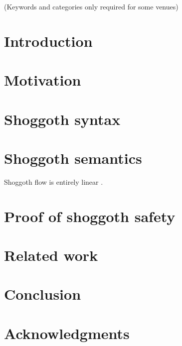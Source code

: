 \maketitle

\begin{abstract}
  
\end{abstract}

\iffinalformat

    \keywords

    (Keywords and categories only required for some venues)
\fi

\section{Introduction}
\label{sec:intro}

\section{Motivation}
\label{sec:motivation}

\section{Shoggoth syntax}
\label{sec:syntax}

\section{Shoggoth semantics}
\label{sec:semantics}

Shoggoth flow is entirely linear \cite{zm02-hosc}.

\section{Proof of shoggoth safety}
\label{sec:safety}

\section{Related work}
\label{sec:related}

\section{Conclusion}
\label{sec:conclusions}

\ifacknowledgments
\section*{Acknowledgments}


\fi



